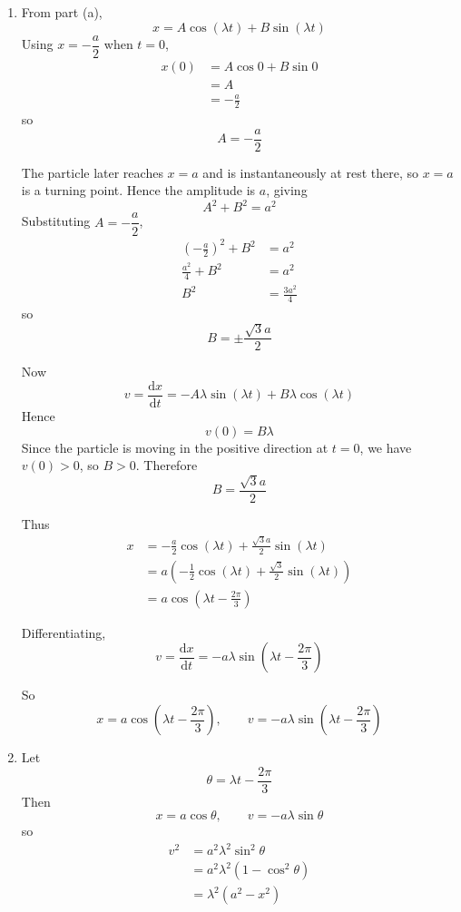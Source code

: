 \documentclass[leqno]{article}
\begin{document}
\begin{enumerate}[
  label=\textbf{\arabic*.},
  leftmargin=*,
  topsep=0pt,
  partopsep=0pt,
  parsep=0pt
]
\begin{tcolorbox}[colback=white, colframe=scarlet, title={\textbf{Solution}}, breakable, grow to left by=6mm, grow to right by=10mm]
\begin{enumerate}[label=\textbf{(\alph*)}]
  \item From part (a),
  \[
  x=A\cos(\lambda t)+B\sin(\lambda t)
  \]
  Using $x=-\dfrac{a}{2}$ when $t=0$,
  \begin{align*}
  x(0)&=A\cos 0+B\sin 0\\
      &=A\\
      &=-\frac{a}{2}
  \end{align*}
  so
  \[
  A=-\frac{a}{2}
  \]

  The particle later reaches $x=a$ and is instantaneously at rest there, so $x=a$ is a turning point. Hence the amplitude is $a$, giving
  \[
  A^2+B^2=a^2
  \]
  Substituting $A=-\dfrac{a}{2}$,
  \begin{align*}
  \left(-\frac{a}{2}\right)^2+B^2&=a^2\\
  \frac{a^2}{4}+B^2&=a^2\\
  B^2&=\frac{3a^2}{4}
  \end{align*}
  so
  \[
  B=\pm \frac{\sqrt{3}a}{2}
  \]

  Now
  \[
  v=\frac{\mathrm{d}x}{\mathrm{d}t}=-A\lambda \sin(\lambda t)+B\lambda \cos(\lambda t)
  \]
  Hence
  \[
  v(0)=B\lambda
  \]
  Since the particle is moving in the positive direction at $t=0$, we have $v(0)>0$, so $B>0$. Therefore
  \[
  B=\frac{\sqrt{3}a}{2}
  \]

  Thus
  \begin{align*}
  x&=-\frac{a}{2}\cos(\lambda t)+\frac{\sqrt{3}a}{2}\sin(\lambda t)\\
   &=a\left(-\frac{1}{2}\cos(\lambda t)+\frac{\sqrt{3}}{2}\sin(\lambda t)\right)\\
   &=a\cos\left(\lambda t-\frac{2\pi}{3}\right)
  \end{align*}

  Differentiating,
  \[
  v=\frac{\mathrm{d}x}{\mathrm{d}t}=-a\lambda \sin\left(\lambda t-\frac{2\pi}{3}\right)
  \]

  So
  \[
  x=a\cos\left(\lambda t-\frac{2\pi}{3}\right),\qquad
  v=-a\lambda \sin\left(\lambda t-\frac{2\pi}{3}\right)
  \]

  \item Let
  \[
  \theta=\lambda t-\frac{2\pi}{3}
  \]
  Then
  \[
  x=a\cos\theta,\qquad v=-a\lambda \sin\theta
  \]
  so
  \begin{align*}
  v^2&=a^2\lambda^2\sin^2\theta\\
     &=a^2\lambda^2(1-\cos^2\theta)\\
     &=\lambda^2(a^2-x^2)
  \end{align*}


\end{enumerate}
\end{tcolorbox}
\end{enumerate}
\end{document}
